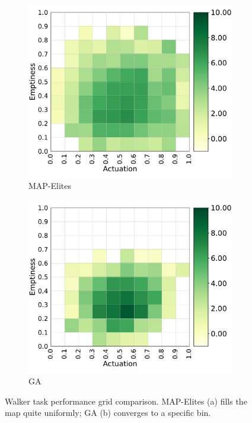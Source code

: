 \begin{figure}[h]
    \centering
    \begin{subfigure}[b]{0.49\textwidth}
         \centering
         \includegraphics[scale=0.45]{images/body_opt/walker_qd_pg}
         \caption{MAP-Elites}
    \end{subfigure}
    \hfill
    \begin{subfigure}[b]{0.49\textwidth}
         \centering
         \includegraphics[scale=0.45]{images/body_opt/walker_ga_pg}
         \caption{GA}
    \end{subfigure}
    \caption{Walker task performance grid comparison. MAP-Elites (a) fills the map quite uniformly; GA (b) converges to a specific bin.}
    \label{fig:qd_ga_walker_pg}
\end{figure}

